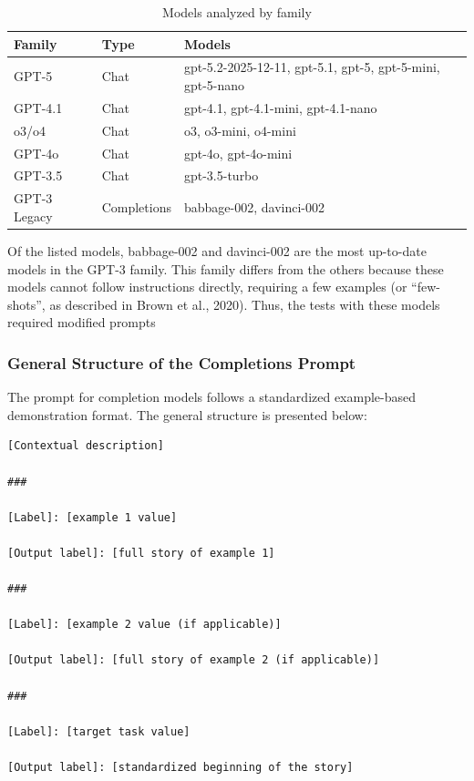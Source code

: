\documentclass[12pt,a4paper]{article}
\begin{document}
\begin{table}[H]
\centering
\caption{Models analyzed by family}
\label{tab:modelos}
\begin{tabular}{lll}
\toprule
\textbf{Family} & \textbf{Type} & \textbf{Models} \\
\midrule
GPT-5 & Chat & gpt-5.2-2025-12-11, gpt-5.1, gpt-5, gpt-5-mini, gpt-5-nano \\
GPT-4.1 & Chat & gpt-4.1, gpt-4.1-mini, gpt-4.1-nano \\
o3/o4 & Chat & o3, o3-mini, o4-mini \\
GPT-4o & Chat & gpt-4o, gpt-4o-mini \\
GPT-3.5 & Chat & gpt-3.5-turbo \\
GPT-3 Legacy & Completions & babbage-002, davinci-002 \\
\bottomrule
\end{tabular}
\end{table}

Of the listed models, babbage-002 and davinci-002 are the
most up-to-date models in the GPT-3 family. This family differs from the
others because these models cannot follow instructions directly,
requiring a few examples (or ``few-shots'', as described in Brown et
al., 2020). Thus, the tests with these models required
modified prompts





\subsubsection{General Structure of the Completions Prompt}
The prompt for completion models follows a standardized example-based demonstration format. The general structure is presented below:

\begin{lstlisting}[caption={General Structure --- Few-shot Completions}]
[Contextual description]

###

[Label]: [example 1 value]

[Output label]: [full story of example 1]

###

[Label]: [example 2 value (if applicable)]

[Output label]: [full story of example 2 (if applicable)]

###

[Label]: [target task value]

[Output label]: [standardized beginning of the story]
\end{lstlisting}
\end{document}
